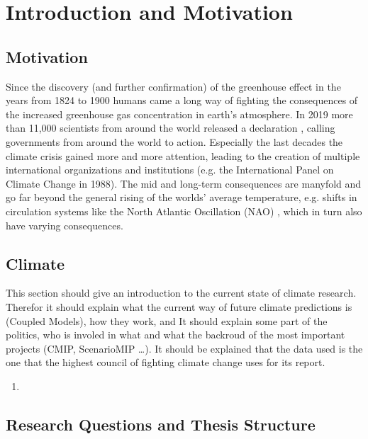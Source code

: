 \chapter{Introduction and Motivation}
\label{ch:intro}


\section{Motivation}
\label{sec:motivation}


Since the discovery (and further confirmation) of the greenhouse effect in the years from 1824 to 1900  humans came a long way of fighting the consequences of the increased greenhouse gas concentration in earth's atmosphere. 
In 2019 more than 11,000  scientists from around the world released a declaration \cite{ripple_world_2019}, calling governments from around the world to action.
Especially the last decades the climate crisis gained more and more attention, leading to the creation of multiple international organizations and institutions (e.g. the International Panel on Climate Change in 1988).
The mid and long-term consequences are manyfold and go far beyond the general rising of the worlds' average temperature, e.g. shifts in circulation systems like the North Atlantic Oscillation (NAO) \cite{vietinghoff_visual_2021}, which in turn also have varying consequences. 



\section{Climate}
\label{sec:climate}

This section should give an introduction to the current state of climate research. 
Therefor it should explain what the current way of future climate predictions is (Coupled Models), how they work, and 
It should explain some part of the politics, who is involed in what and what the backroud of the most important projects (CMIP, ScenarioMIP \dots). 
It should be explained that the data used is the one that the highest council of fighting climate change uses for its report. 

\begin{enumerate}
  \item
  
\end{enumerate}


\section{Research Questions and Thesis Structure}
\label{sec:research_questions}


